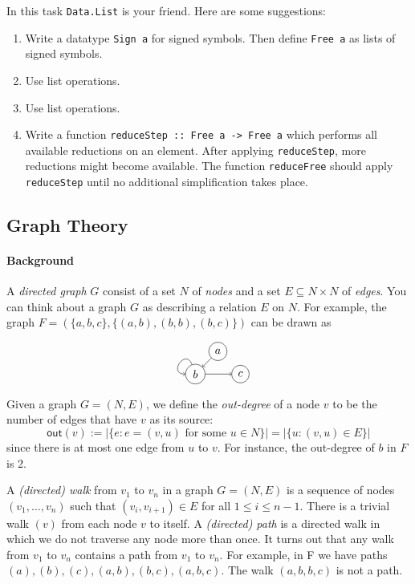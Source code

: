 \documentclass{article}[12pt]
\theoremstyle{definition}
\begin{document}
In this task \verb|Data.List| is your friend. Here are some suggestions:
\begin{enumerate}
    \item Write a datatype \verb|Sign a| for signed symbols. Then define \verb|Free a| as lists of signed symbols.
    \item Use list operations.
    \item Use list operations.
    \item Write a function \verb|reduceStep :: Free a -> Free a| which performs all available reductions on an element. After applying \verb|reduceStep|, more reductions might become available. The function \verb|reduceFree| should apply \verb|reduceStep| until no additional simplification takes place.
\end{enumerate}

\subsection{Graph Theory}
\noindent{}

\paragraph{Background} A \emph{directed graph} $G$ consist of a set $N$ of \emph{nodes} and a set $E \subseteq N \times N$ of \emph{edges}. You can think about a graph $G$ as describing a relation $E$ on $N$. For example, the graph $F = ( \{a,b,c\}, \{(a,b), (b,b), (b,c)\}  )$ can be drawn as

$$
\begin{tikzpicture}[main/.style = {draw, circle}]
    \node[main] (1) {$a$};
    \node[main] (2) [below left of = 1] {$b$};
    \node[main] (3) [below right of = 1] {$c$};
    \draw[->] (1) -- (2);
    \draw[->] (2) -- (3);
    \draw[->] (2) to [out = 110, in=180, looseness = 4] (2);
\end{tikzpicture}
$$

Given a graph $G = (N,E)$, we define the \emph{out-degree} of a node $v$ to be the number of edges that have $v$ as its source: 
$$\mathsf{out}(v) := | \{e : e = (v,u) \text{ for some } u \in N \} | = | \{u : (v,u) \in E \} | $$
since there is at most one edge from $u$ to $v$. For instance, the out-degree of $b$ in $F$ is 2.

A \emph{(directed) walk} from $v_1$ to $v_n$ in a graph $G = (N,E)$ is a sequence of nodes $(v_1, \ldots, v_n)$ such that $(v_i, v_{i+1}) \in E$ for all $1 \leq i \leq n-1$. There is a trivial walk $(v)$ from each node $v$ to itself. A \emph{(directed) path} is a directed walk in which we do not traverse any node more than once. It turns out that any walk from $v_1$ to $v_n$ contains a path from $v_1$ to $v_n$. For example, in F we have paths $(a), (b), (c), (a,b), (b,c), (a,b,c)$. The walk $(a,b,b,c)$ is not a path.
\end{document}

